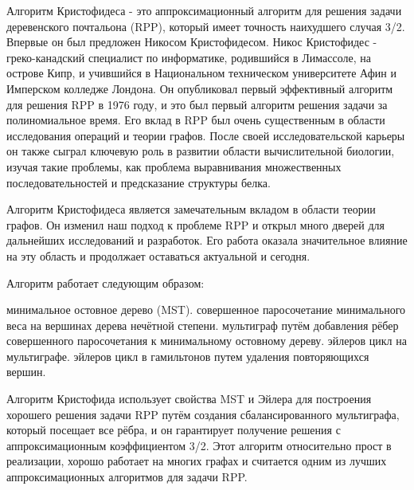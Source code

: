 Алгоритм Кристофидеса - это аппроксимационный алгоритм для решения задачи деревенского почтальона (RPP), который имеет точность наихудшего случая 3/2. Впервые он был предложен Никосом Кристофидесом.
\newline
\newline
Никос Кристофидес - греко-канадский специалист по информатике, родившийся в Лимассоле, на острове Кипр, и учившийся в Национальном техническом университете Афин и Имперском колледже Лондона. Он опубликовал первый эффективный алгоритм для решения RPP в 1976 году, и это был первый алгоритм решения задачи за полиномиальное время. Его вклад в RPP был очень существенным в области исследования операций и теории графов. После своей исследовательской карьеры он также сыграл ключевую роль в развитии области вычислительной биологии, изучая такие проблемы, как проблема выравнивания множественных последовательностей и предсказание структуры белка.


Алгоритм Кристофидеса является замечательным вкладом в области теории графов. Он изменил наш подход к проблеме RPP и открыл много дверей для дальнейших исследований и разработок. Его работа оказала значительное влияние на эту область и продолжает оставаться актуальной и сегодня.


Алгоритм работает следующим образом:

\begin{enumerate}
 минимальное остовное дерево (MST).
 совершенное паросочетание минимального веса на вершинах дерева нечётной степени.
 мультиграф путём добавления рёбер совершенного паросочетания к минимальному остовному дереву.
 эйлеров цикл на мультиграфе.
 эйлеров цикл в гамильтонов путем удаления повторяющихся вершин.
\end{enumerate}
Алгоритм Кристофида использует свойства MST и Эйлера для построения хорошего решения задачи RPP путём создания сбалансированного мультиграфа, который посещает все рёбра, и он гарантирует получение решения с аппроксимационным коэффициентом 3/2. Этот алгоритм относительно прост в реализации, хорошо работает на многих графах и считается одним из лучших аппроксимационных алгоритмов для задачи RPP.
